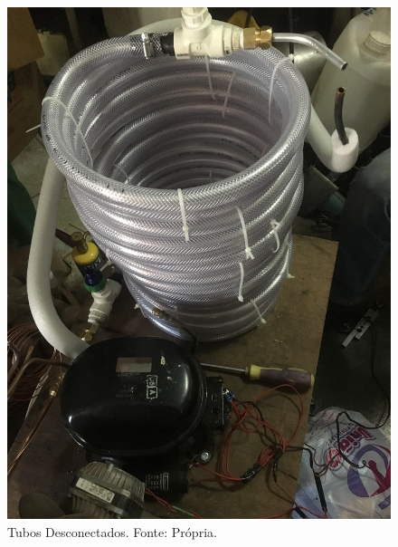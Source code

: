                         \begin{figure}[!htb]
                            \centering
                            \includegraphics[scale= 0.2]{figuras/tubos-desconectados.png}
                            \caption{Tubos Desconectados. Fonte: Própria.}
                            \label{tubos-desconectados}
                        \end{figure}

